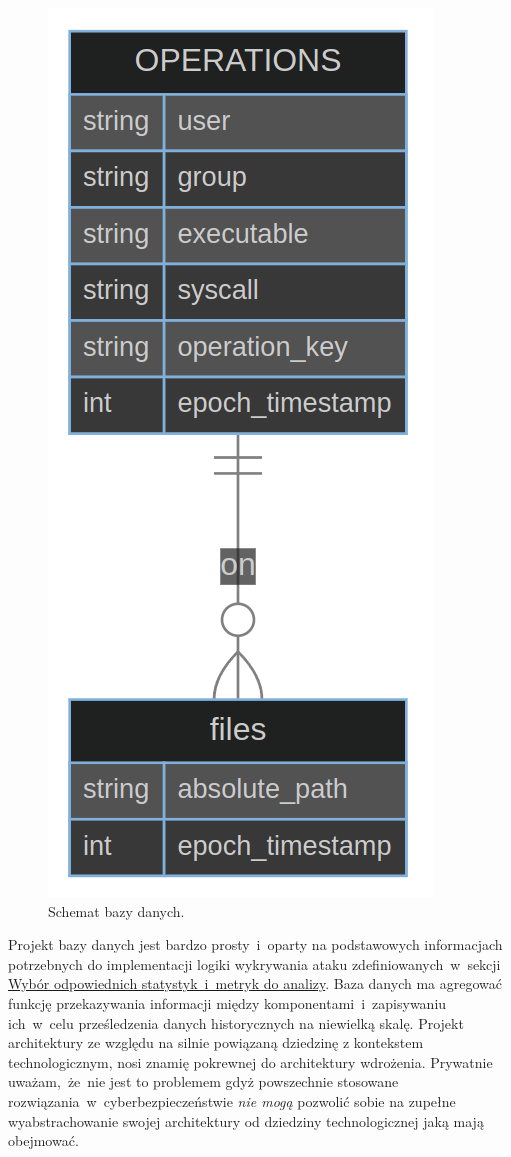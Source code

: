 \begin{figure}[H]
    \centering
    \includegraphics[width=0.3\linewidth]{rysunki/db.png}
    \caption{Schemat bazy danych.}
    \label{fig:enter-label}
\end{figure}
Projekt bazy danych jest bardzo prosty~i~oparty na podstawowych informacjach potrzebnych do implementacji logiki wykrywania ataku zdefiniowanych~w~sekcji \hyperref[sec:wybor]{Wybór odpowiednich statystyk~i~metryk do analizy}. Baza danych ma agregować funkcję przekazywania informacji między komponentami~i~zapisywaniu ich~w~celu prześledzenia danych historycznych na niewielką skalę.
\newline
Projekt architektury ze względu na silnie powiązaną dziedzinę z kontekstem technologicznym, nosi znamię pokrewnej do architektury wdrożenia. Prywatnie uważam,~że~nie jest to problemem gdyż powszechnie stosowane rozwiązania~w~cyberbezpieczeństwie \emph{nie mogą} pozwolić sobie na zupełne wyabstrachowanie swojej architektury od dziedziny technologicznej jaką mają obejmować.
